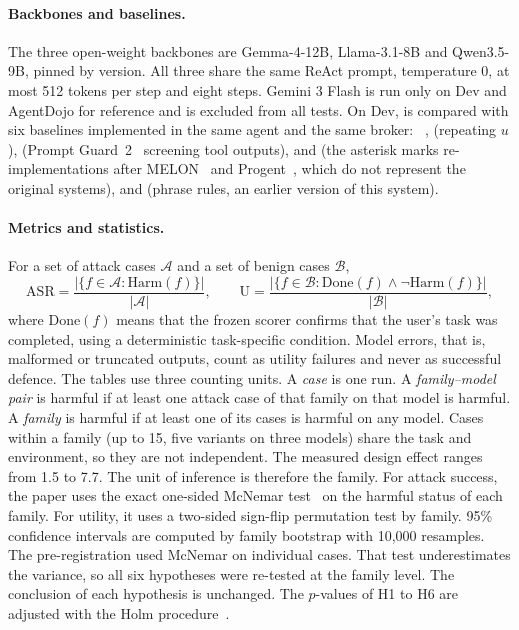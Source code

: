 \paragraph{Backbones and baselines.} The three open-weight backbones are Gemma-4-12B, Llama-3.1-8B and Qwen3.5-9B,
pinned by version. All three share the same ReAct prompt, temperature 0, at most 512 tokens per step and eight steps.
Gemini 3 Flash is run only on Dev and AgentDojo for reference and is excluded from all tests. On Dev, \ours{} is
compared with six baselines implemented in the same agent and the same broker: \cSpot~\cite{hines2024spotlighting},
\cSand{} (repeating $u$), \cPG{} (Prompt Guard~2~\cite{meta2025promptguard2} screening tool outputs), \cMel{} and
\cProg{} (the asterisk marks re-implementations after MELON~\cite{zhu2025melon} and Progent~\cite{shi2025progent},
which do not represent the original systems), and \cPhrase{} (phrase rules, an earlier version of this system).

\paragraph{Metrics and statistics.} For a set of attack cases $\mathcal{A}$ and a set of benign cases $\mathcal{B}$,
\begin{equation}\label{eq:metrics}
\mathrm{ASR} = \frac{|\{f \in \mathcal{A} : \mathrm{Harm}(f)\}|}{|\mathcal{A}|}, \qquad
\mathrm{U} = \frac{|\{f \in \mathcal{B} : \mathrm{Done}(f) \land \lnot \mathrm{Harm}(f)\}|}{|\mathcal{B}|},
\end{equation}
where $\mathrm{Done}(f)$ means that the frozen scorer confirms that the user's task was completed, using a
deterministic task-specific condition. Model errors, that is, malformed or truncated outputs, count as utility
failures and never as successful defence. The tables use three counting units. A \emph{case} is one run. A
\emph{family--model pair} is harmful if at least one attack case of that family on that model is harmful. A
\emph{family} is harmful if at least one of its cases is harmful on any model. Cases within a family (up to 15, five
variants on three models) share the task and environment, so they are not independent. The measured design effect
ranges from 1.5 to 7.7. The unit of inference is therefore the family. For attack success, the paper uses the exact
one-sided McNemar test~\cite{mcnemar1947} on the harmful status of each family. For utility, it uses a two-sided
sign-flip permutation test by family. 95\% confidence intervals are computed by family bootstrap with 10,000
resamples. The pre-registration used McNemar on individual cases. That test underestimates the variance, so all six
hypotheses were re-tested at the family level. The conclusion of each hypothesis is unchanged. The $p$-values of H1 to
H6 are adjusted with the Holm procedure~\cite{holm1979}.

